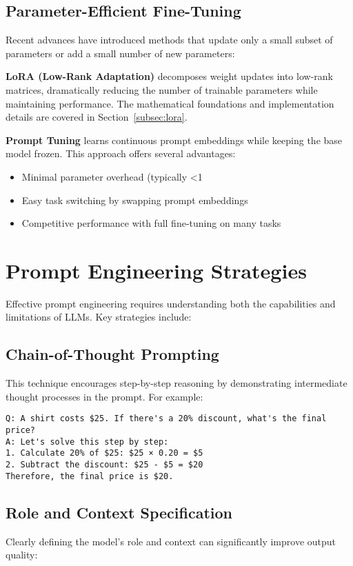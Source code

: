 \subsection{Parameter-Efficient Fine-Tuning}
\noindent
Recent advances have introduced methods that update only a small subset of parameters or add a small number of new parameters:

\textbf{LoRA (Low-Rank Adaptation)} decomposes weight updates into low-rank matrices, dramatically reducing the number of trainable parameters while maintaining performance. The mathematical foundations and implementation details are covered in Section~\ref{subsec:lora}.

\textbf{Prompt Tuning} learns continuous prompt embeddings while keeping the base model frozen. This approach offers several advantages:
\begin{itemize}
    \item Minimal parameter overhead (typically <1%
    \item Easy task switching by swapping prompt embeddings
    \item Competitive performance with full fine-tuning on many tasks
\end{itemize}

\section{Prompt Engineering Strategies}
\noindent
Effective prompt engineering requires understanding both the capabilities and limitations of LLMs. Key strategies include:

\subsection{Chain-of-Thought Prompting}
\noindent
This technique encourages step-by-step reasoning by demonstrating intermediate thought processes in the prompt. For example:

\begin{verbatim}
Q: A shirt costs $25. If there's a 20% discount, what's the final price?
A: Let's solve this step by step:
1. Calculate 20% of $25: $25 × 0.20 = $5
2. Subtract the discount: $25 - $5 = $20
Therefore, the final price is $20.
\end{verbatim}

\subsection{Role and Context Specification}
\noindent
Clearly defining the model's role and context can significantly improve output quality:

